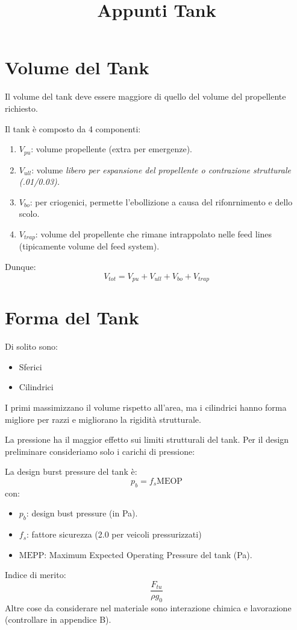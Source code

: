 
\title{Appunti Tank}

    \maketitle
    \tableofcontents
    \newpage
    \section{Volume del Tank}
    Il volume del tank deve essere maggiore di 
    quello del volume del propellente richiesto.

    Il tank è composto da 4 componenti:
    \begin{enumerate}
        \item $V_{pu}$: volume propellente (extra per emergenze).
        \item $V_{ull}$: volume \it{libero} per espansione del propellente o contrazione strutturale (.01/0.03).
        \item $V_{bo}$: per criogenici, permette l'ebollizione a causa del rifonrnimento e dello scolo.
        \item $V_{trap}$: volume del propellente che rimane intrappolato nelle feed lines (tipicamente volume del feed system).  
    \end{enumerate}
    Dunque: 
    \[V_{tot} = V_{pu} + V_{ull} + V_{bo} + V_{trap}\]
    \section{Forma del Tank}
    Di solito sono: 
    \begin{itemize}
        \item Sferici
        \item Cilindrici
    \end{itemize}
    I primi massimizzano il volume rispetto all'area, ma i cilindrici hanno forma 
    migliore per razzi e migliorano la rigidità strutturale.
    
    La pressione ha il maggior effetto sui limiti strutturali del tank. Per il design
    preliminare consideriamo solo i carichi di pressione:

    La design burst pressure del tank è:
    \[p_b = f_s \text{MEOP}\]
    con: 
    \begin{itemize}
        \item $p_b$: design bust pressure (in Pa).
        \item $f_s$: fattore sicurezza (2.0 per veicoli pressurizzati)
        \item $\text{MEPP}$: Maximum Expected Operating Pressure del tank (Pa).
    \end{itemize}
    Indice di merito: \[\frac{F_{tu}}{\rho g_0}\]
    Altre cose da considerare nel materiale sono interazione 
    chimica e lavorazione (controllare in appendice B).
